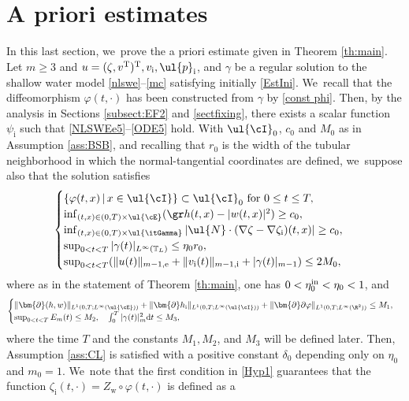 \section{A priori estimates}\label{sect:APE}
In this last section, we~prove the a priori estimate given in Theorem \ref{th:main}.
Let $m\geq 3$ and $u=(\zeta,v^{\rm T})^{\rm T}, v_\mathrm{i}, \ul{p}_\mathrm{i}$, and $\gamma$ be a regular solution
to the shallow water model \eqref{nlswe}--\eqref{mc} satisfying initially \eqref{EstIni}. We~recall that the diffeomorphism $\varphi(t,\cdot)$ has been constructed from $\gamma$ by \eqref{const phi}.
Then, by the analysis in Sections \ref{subsect:EF2} and \ref{sectfixing},
there exists a scalar function $\psi_\mathrm{i}$ such that \eqref{NLSWEe5}--\eqref{ODE5} hold.
With $ \ul{\cI}_0$, $c_0$ and $M_0$ as in Assumption \ref{ass:BSB},
and recalling that $r_0$ is the width of the tubular neighborhood in which the normal-tangential coordinates are defined, we~suppose also that the solution satisfies
\begin{equation}\label{Hyp1}
\begin{cases}
\{ \varphi(t,x) \,|\, x\in\ul{\cI} \} \subset \ul{\cI}_0 \mbox{ for } 0\leq t\leq T, \\
\inf_{(t,x)\in(0,T)\times\ul{\cE}}(\gr h(t,x)-|w(t,x)|^2) \geq c_0, \\
\inf_{(t,x)\in(0,T)\times\ul{\itGamma}}| \ul{N}\cdot(\nabla\zeta-\nabla\zeta_\mathrm{i})(t,x)| \geq c_0, \\
\sup_{0<t<T}|\gamma(t)|_{L^\infty(\mathbb{T}_L)} \leq \eta_0r_0, \\
\sup_{0<t<T}(\|u(t)\|_{m-1,{\rm e}} + \|v_\mathrm{i}(t)\|_{m-1,{\rm i}} + |\gamma(t)|_{m-1}) \leq 2M_0,
\end{cases}
\end{equation}
where as in the statement of Theorem \ref{th:main}, one has $0<\eta_0^{\rm in}<\eta_0<1$, and
\begin{equation}\label{Hyp2}
\begin{cases}
\|\bm{\partial}(h,w)\|_{L^1(0,T;L^\infty(\ul{\cE}))} + \|\bm{\partial} h_\mathrm{i}\|_{L^1(0,T;L^\infty(\ul{\cI}))}
+ \|\bm{\partial}\partial\varphi\|_{L^1(0,T;L^\infty(\R^2))} \leq M_1, \\
\sup_{0<t<T}E_m(t) \leq M_2, \quad \int_0^T|\gamma(t)|_m^2{\rm d}t \leq M_3,
\end{cases}
\end{equation}
where the time $T$ and the constants $M_1, M_2$, and $M_3$ will be defined later.
Then, Assumption \ref{ass:CL} is satisfied with a positive constant $\delta_0$ depending only on $\eta_0$ and $m_0=1$. We~note that the first condition in \eqref{Hyp1} guarantees that the function $\zeta_\mathrm{i}(t,\cdot)=Z_\mathrm{w}\circ\varphi(t,\cdot)$ is defined as a
